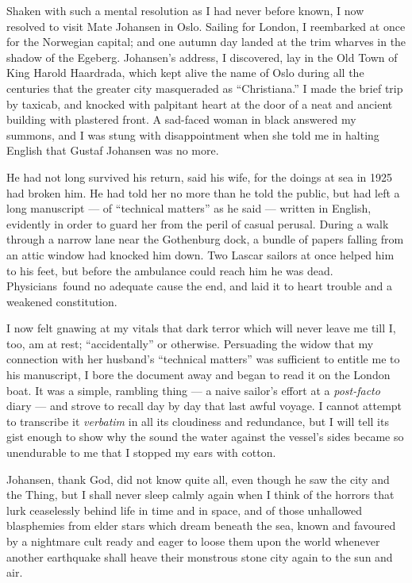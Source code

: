 Shaken with such a mental resolution as I had never before known, I now
resolved to visit Mate Johansen in Oslo. Sailing for London, I
reembarked at once for the Norwegian capital; and one autumn day landed
at the trim wharves in the shadow of the Egeberg. Johansen's address, I
discovered, lay in the Old Town of King Harold Haardrada, which kept
alive the name of Oslo during all the centuries that the greater city
masqueraded as ``Christiana.'' I made the brief trip by taxicab, and
knocked with palpitant heart at the door of a neat and ancient building
with plastered front. A sad-faced woman in black answered my summons,
and I was stung with disappointment when she told me in halting English
that Gustaf Johansen was no more.

He had not long survived his return, said his wife, for the doings at
sea in 1925 had broken him. He had told her no more than he told the
public, but had left a long manuscript --- of ``technical matters'' as he
said --- written in English, evidently in order to guard her from the
peril of casual perusal. During a walk through a narrow lane near the
Gothenburg dock, a bundle of papers falling from an attic window had
knocked him down. Two Lascar sailors at once helped him to his feet, but
before the ambulance could reach him he was dead. Physicians\est\ found no
adequate cause the end, and laid it to heart trouble and a weakened
constitution.

I now felt gnawing at my vitals that dark terror which
will never leave me till I, too, am at rest; ``accidentally'' or
otherwise. Persuading the widow that my connection with her husband's
``technical matters'' was sufficient to entitle me to his manuscript, I
bore the document away and began to read it on the London boat.
It was a simple, rambling thing --- a naive sailor's effort at a
\emph{post-facto} diary --- and strove to recall day by day that last awful
voyage. I cannot attempt to transcribe it \emph{verbatim} in all its cloudiness
and redundance, but I will tell its gist enough to show why the sound
the water against the vessel's sides became so unendurable to me that I
stopped my ears with cotton.

Johansen, thank God, did not know quite all, even though he saw the city
and the Thing, but I shall never sleep calmly again when I think of the
horrors that lurk ceaselessly behind life in time and in space, and of
those unhallowed blasphemies from elder stars which dream beneath the
sea, known and favoured by a nightmare cult ready and eager to loose
them upon the world whenever another earthquake shall heave their
monstrous stone city again to the sun and air.

